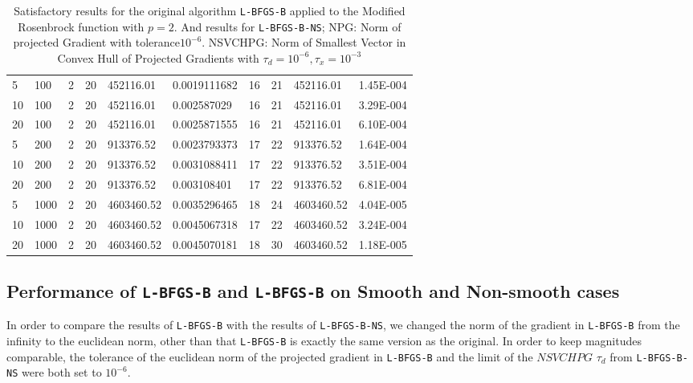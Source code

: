 \begin{center}
\begin{table}
\begin{center}
\begin{tabular}{|l|l|l|l|l|l|l|l|l|l|}
        5 & 100 & 2 & 20 & 452116.01 & 0.0019111682 & 16 & 21 & 452116.01 & 1.45E-004\\
        10 & 100 & 2 & 20 & 452116.01 & 0.002587029 & 16 & 21 & 452116.01 & 3.29E-004\\
        20 & 100 & 2 & 20 & 452116.01 & 0.0025871555 & 16 & 21 & 452116.01 & 6.10E-004\\
        5 & 200 & 2 & 20 & 913376.52& 0.0023793373 & 17 & 22 & 913376.52 & 1.64E-004\\
        10 & 200 & 2 & 20 & 913376.52 & 0.0031088411 & 17 & 22 & 913376.52 & 3.51E-004\\
        20 & 200 & 2 & 20 & 913376.52 & 0.003108401 & 17 & 22 & 913376.52 & 6.81E-004\\
        5 & 1000 & 2 & 20 & 4603460.52 & 0.0035296465 & 18 & 24 & 4603460.52 & 4.04E-005\\
        10 & 1000 & 2 & 20 & 4603460.52 & 0.0045067318 & 17 & 22 & 4603460.52 & 3.24E-004\\
        20 & 1000 & 2 & 20 & 4603460.52 & 0.0045070181 & 18 & 30 & 4603460.52 & 1.18E-005\\
        \hline
      \end{tabular}
      \caption[Modified Rosenbrock with $p = 2$]{Satisfactory results for the original algorithm \texttt{L-BFGS-B} applied to the Modified Rosenbrock function with $p = 2$.  And results for \texttt{L-BFGS-B-NS}; NPG: Norm of projected Gradient with tolerance$10^{-6}$. NSVCHPG: Norm of Smallest Vector in Convex Hull of Projected Gradients with $\tau_d = 10^{-6}, \tau_x = 10^{-3}$}
      \label{pequal2}
      \end{center}
  \end{table}
\end{center}

\subsection{Performance of \texttt{L-BFGS-B} and  \texttt{L-BFGS-B} on Smooth and Non-smooth cases}

In order to compare the results of \texttt{L-BFGS-B} with the results of \texttt{L-BFGS-B-NS}, we changed the norm of the gradient in \texttt{L-BFGS-B} from the infinity to the euclidean norm, other than that \texttt{L-BFGS-B} is exactly the same version as the original. In order to keep magnitudes comparable, the tolerance of the euclidean norm of the projected gradient in \texttt{L-BFGS-B} and the limit of the $NSVCHPG$ $\tau_d$ from \texttt{L-BFGS-B-NS} were both set to $10^{-6}$.

